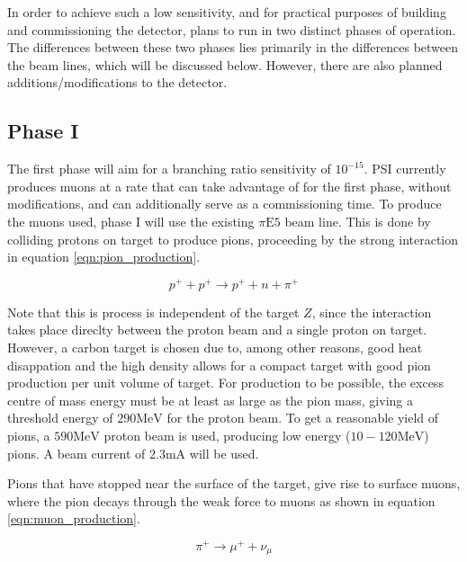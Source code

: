 In order to achieve such a low sensitivity, and for practical purposes of building and commissioning the detector, \mueee plans to run in two distinct phases of operation.
The differences between these two phases lies primarily in the differences between the beam lines, which will be discussed below.
However, there are also planned additions/modifications to the detector.

\subsection{Phase I}
The first phase will aim for a branching ratio sensitivity of $10^{-15}$.
PSI currently produces muons at a rate that \mueee can take advantage of for the first phase, without modifications, and can additionally serve as a commissioning time.
To produce the muons used, phase I will use the existing $\pi\textrm{E5}$ beam line.
This is done by colliding protons on target to produce pions, proceeding by the strong interaction in equation \ref{eqn:pion_production}.

\begin{equation}
\label{eqn:pion_production}
p^+ + p^+ \rightarrow p^+ + n + \pi^+
\end{equation}

\noindent Note that this is process is independent of the target $Z$, since the interaction takes place direclty between the proton beam and a single proton on target.
However, a carbon target is chosen due to, among other reasons, good heat disappation and the high density allows for a compact target with good pion production per unit volume of target.
For production to be possible, the excess centre of mass energy must be at least as large as the pion mass, giving a threshold energy of $290\textrm{MeV}$ for the proton beam.
To get a reasonable yield of pions, a $590\textrm{MeV}$ proton beam is used, producing low energy ($10-120\textrm{MeV}$) pions.
A beam current of $2.3\textrm{mA}$ will be used.

Pions that have stopped near the surface of the target, give rise to surface muons, where the pion decays through the weak force to muons as shown in equation \ref{eqn:muon_production}.

\begin{equation}
\label{eqn:muon_production}
\pi^+ \rightarrow \mu^+ + \nu_\mu
\end{equation}

